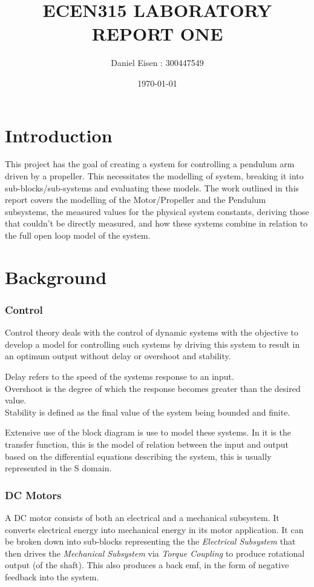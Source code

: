 \documentclass[a4paper,11pt]{article}
\title{ECEN315 LABORATORY REPORT ONE}
\author{Daniel Eisen : 300447549}
\date{\today}
\begin{document}
\maketitle
\section{Introduction}
This project has the goal of creating a system for controlling a pendulum arm driven by a propeller. This necessitates the modelling of system, breaking it into sub-blocks/sub-systems and evaluating these models. The work outlined in this report covers the modelling of the Motor/Propeller and the Pendulum subsystems, the measured values for the physical system constants, deriving those that couldn't be directly measured, and how these systems combine in relation to the full open loop model of the system.

\section{Background}
\subsubsection*{Control}
Control theory deals with the control of dynamic systems with the objective to develop a model for controlling such systems by driving this system to result in an optimum output without delay or overshoot and stability.

Delay refers to the speed of the systems response to an input. \\
Overshoot is the degree of which the response becomes greater than the desired value.\\
Stability is defined as the final value of the system being bounded and finite.

Extensive use of the block diagram is use to model these systems. In it is the transfer function, this is the model of relation between the input and output based on the differential equations describing the system, this is usually represented in the S domain.

\subsubsection*{DC Motors}
A DC motor consists of both an electrical and a mechanical subsystem. It converts electrical energy into mechanical energy in its motor application. It can be broken down into sub-blocks representing the the \textit{Electrical Subsystem} that then drives the \textit{Mechanical Subsystem} via \textit{Torque Coupling} to produce rotational output (of the shaft). This also produces a back emf, in the form of negative feedback into the system.   
\end{document}
